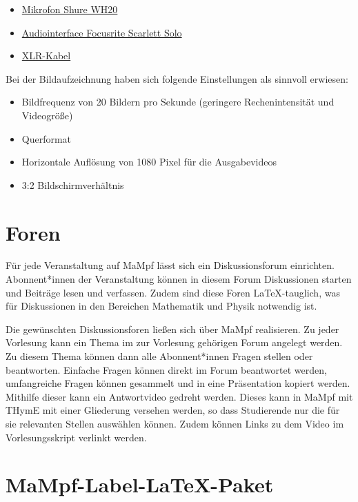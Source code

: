 \documentclass[parskip=off,index=totocnumbered]{scrreprt}
\begin{document}
\begin{itemize}
   \item \href{https://www.thomann.de/de/shure_wh20xlr.htm}{Mikrofon Shure WH20}
   \item \href{https://www.thomann.de/de/focusrite_scarlett_solo_3rd_gen.htm}{Audiointerface Focusrite Scarlett Solo}
   \item \href{https://www.thomann.de/de/the_sssnake_sk23315_xlr_patch.htm}{XLR-Kabel}
\end{itemize}

Bei der Bildaufzeichnung haben sich folgende Einstellungen als sinnvoll erwiesen: 
\begin{itemize}
   \item Bildfrequenz von 20 Bildern pro Sekunde (geringere Rechenintensität und Videogröße)
   \item Querformat
   \item Horizontale Auflösung von 1080 Pixel für die Ausgabevideos
   \item 3:2 Bildschirmverhältnis
\end{itemize}

\section{Foren}
Für jede Veranstaltung auf MaMpf lässt sich ein Diskussionsforum einrichten. Abonnent*innen der Veranstaltung können in diesem Forum Diskussionen starten und Beiträge lesen und verfassen. Zudem sind diese Foren \LaTeX-tauglich, was für Diskussionen in den Bereichen Mathematik und Physik notwendig ist.

Die gewünschten Diskussionsforen ließen sich über MaMpf realisieren. Zu jeder Vorlesung kann ein Thema im zur Vorlesung gehörigen Forum angelegt werden. Zu diesem Thema können dann alle Abonnent*innen Fragen stellen oder beantworten. Einfache Fragen können direkt im Forum beantwortet werden, umfangreiche Fragen können gesammelt und in eine Präsentation kopiert werden. Mithilfe dieser kann ein Antwortvideo gedreht werden. Dieses kann in MaMpf mit THymE mit einer Gliederung versehen werden, so dass Studierende nur die für sie relevanten Stellen auswählen können. Zudem können Links zu dem Video im Vorlesungsskript verlinkt werden.

\section{MaMpf-Label-\LaTeX-Paket}
\end{document}
